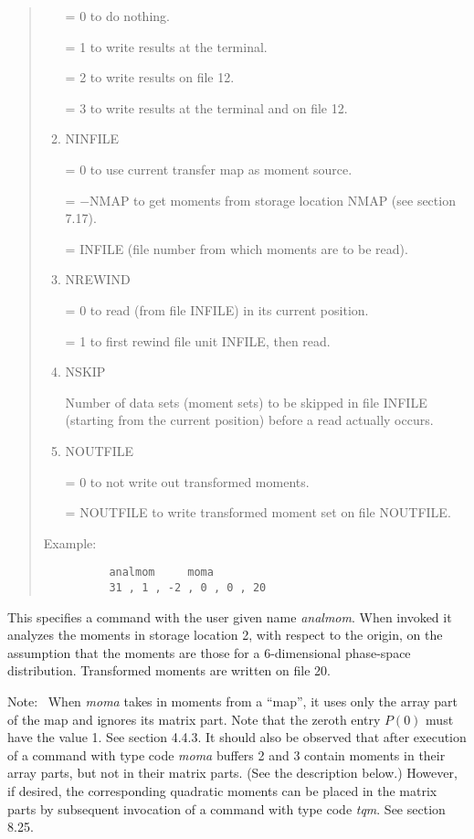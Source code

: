 \begin{quotation}
\begin{enumerate}
       = 0 to do nothing.

       = 1 to write results at the terminal.

       = 2 to write results on file 12.

       = 3 to write results at the terminal and on file 12.

\item NINFILE

       = 0 to use current transfer map as moment source.

             = $-$NMAP to get moments from storage location NMAP
			   (see section 7.17).

             = INFILE (file number from which moments are to be
               read).

      \item  NREWIND

             = 0 to read (from file INFILE) in its current position.

             = 1 to first rewind file unit INFILE, then read.

      \item  NSKIP

             Number of data sets (moment sets) to be skipped
             in file INFILE (starting from the current position) before a
             read actually occurs.

      \item  NOUTFILE

             = 0 to not write out transformed moments.

             = NOUTFILE to write transformed moment set on file NOUTFILE.
\end{enumerate}

\vspace{5mm}
\noindent Example:
\begin{verbatim}
          analmom     moma
          31 , 1 , -2 , 0 , 0 , 20
\end{verbatim}
\end{quotation}
This specifies a command with the user given name {\em analmom}.  When invoked it analyzes the moments in storage location 2, with respect to the origin, on the assumption that the moments are those for a 6-dimensional phase-space distribution.  Transformed moments are written on file 20.

Note: \ When {\em moma} takes in moments from a ``map'', it uses only the array part of the map and ignores its matrix part.  Note that the zeroth entry $P(0)$ must have the value 1.  See section 4.4.3.  It should also be observed that after execution of a command with type code
{\em moma} buffers 2 and 3 contain moments in their array parts, but not in
their matrix parts.  (See the description below.)  However, if
desired,  the corresponding quadratic moments can be placed in the
matrix parts by subsequent invocation of a command with type code {\em tqm}.
See section 8.25.

